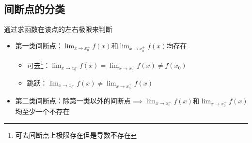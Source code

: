 \documentclass[10pt, a4paper, oneside, UTF8]{ctexbook}
\begin{document}
\begin{sloppypar}
    \subsection{间断点的分类}
    通过求函数在该点的左右极限来判断
    \begin{itemize}
        \item 第一类间断点：$\lim _ { x \rightarrow x _ { 0 } ^{-}} f ( x )$​ 和$\lim _ { x \rightarrow x _ { 0 }^ {+}} f ( x )$​ 均存在
              \begin{itemize}
                  \item 可去\footnote{可去间断点上极限存在但是导数不存在}：$\lim _ { x \rightarrow x_0 ^ { - } } f ( x ) = \lim _ { x \rightarrow x_0^{+} } f  ( x ) \neq f(x_0)$
                  \item 跳跃：$\lim _ { x \rightarrow x_0^{-} } f ( x ) \not= \lim _ { x \rightarrow x_0^{+} } f ( x )$
              \end{itemize}
        \item 第二类间断点：除第一类以外的间断点$\implies \lim _ { x \rightarrow x _ { 0 } ^{-}} f ( x )$和$\lim _ { x \rightarrow x _ { 0 }^ {+}} f ( x )$​ 均至少一个不存在
    \end{itemize}
    \ifx\allfiles\undefined
\end{sloppypar}
\end{document}
